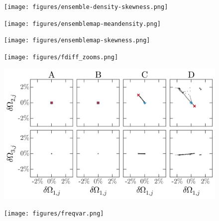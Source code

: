 \documentclass[letterpaper,12pt,preprint]{aastex}
\begin{document}
\clearpage
\begin{figure}[p]
\begin{center}
\texttt{[image: figures/ensemble-density-skewness.png]}
\caption{ } \label{fig:density-skewness}
\end{center}
\end{figure}

\clearpage
\begin{figure}[p]
\begin{center}
\texttt{[image: figures/ensemblemap-meandensity.png]}
\caption{ } \label{fig:ensemblemap-meandensity}
\end{center}
\end{figure}

\clearpage
\begin{figure}[p]
\begin{center}
\texttt{[image: figures/ensemblemap-skewness.png]}
\caption{ } \label{fig:ensemblemap-skewness}
\end{center}
\end{figure}

\clearpage
\begin{figure}[p]
\begin{center}
\texttt{[image: figures/fdiff\_zooms.png]}
\caption{ } \label{fig:fdiff-zooms}
\end{center}
\end{figure}

\clearpage
\begin{figure}[p]
\begin{center}
\includegraphics[width=\textwidth]{figures/freq-evolution.png}
\caption{ } \label{fig:three-orbits-freqs}
\end{center}
\end{figure}

\clearpage
\begin{figure}[p]
\begin{center}
\texttt{[image: figures/freqvar.png]}
\caption{ } \label{fig:freqvar_map}
\end{center}
\end{figure}
\end{document}
